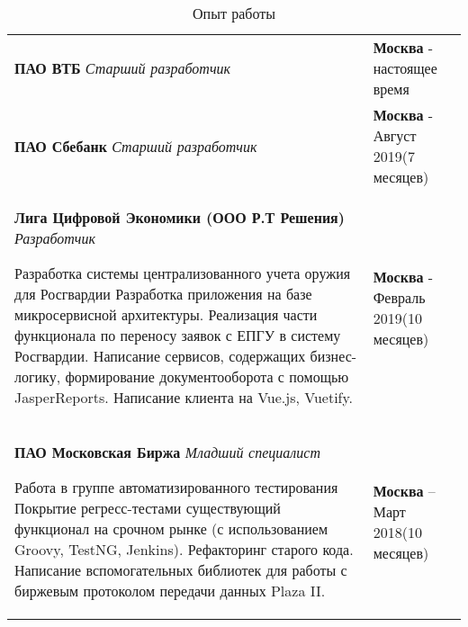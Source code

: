 \documentclass{article}
\begin{document}
\begin{table}[h!]
\begin{center}
\caption*{Опыт работы}
\def\arraystretch{1.7}%
\begin{tabular}
{ L{13cm} R{5cm} } \hhline{|=|=|}

\textbf{ПАО ВТБ}\newline
\emph{Старший разработчик}\medskip


& \textbf{Москва} - настоящее время \\

\textbf{ПАО Сбебанк}\newline
\emph{Старший разработчик}\medskip
& \textbf{Москва} - Август 2019\newline(7 месяцев) \\

\textbf{Лига Цифровой Экономики (ООО Р.Т Решения)}\newline
\emph{Разработчик}\medskip

Разработка системы централизованного учета оружия для Росгвардии\newline
Разработка приложения на базе микросервисной архитектуры. Реализация части функционала по переносу заявок с ЕПГУ в систему Росгвардии. Написание сервисов, содержащих бизнес-логику, формирование документооборота с помощью JasperReports. Написание клиента на Vue.js, Vuetify.
& \textbf{Москва} - Февраль 2019\newline(10 месяцев) \\ 

\textbf{ПАО Московская Биржа}\newline
\emph{Младший специалист}\medskip

Работа в группе автоматизированного тестирования\newline
Покрытие регресс-тестами существующий функционал на срочном рынке (с использованием Groovy, TestNG, Jenkins). Рефакторинг старого кода. Написание вспомогательных библиотек для работы с биржевым протоколом передачи данных Plaza II.
& \textbf{Москва} – Март 2018\newline(10 месяцев) \\

\end{tabular}
\end{center}
\end{table}
\end{document}
